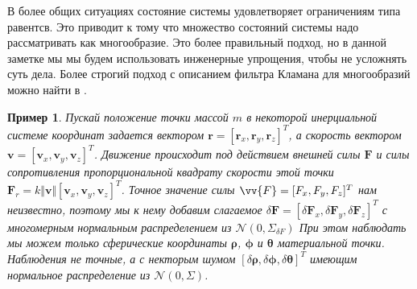 \documentclass[12pt]{article}
\newtheorem{example}[theorem]{Пример}
\begin{document}
В более общих ситуациях состояние системы удовлетворяет ограничениям типа равентсв. Это приводит к тому 
что множество состояний системы надо рассматривать как многообразие. Это более правильный подход, но в 
данной заметке мы мы будем использовать инженерные упрощения, чтобы не усложнять суть дела. Более строгий
подход с описанием фильтра Кламана для многообразий можно найти в \cite{KalmFiltDiffMan}.


\begin{example}
    Пускай положение точки массой $m$ в некоторой
    инерциальной системе координат задается вектором
    $\pmb{r}=[\pmb{r}_x, \pmb{r}_y, \pmb{r}_z]^T$, а скорость
    вектором $\pmb{v}=[\pmb{v}_x, \pmb{v}_y, \pmb{v}_z]^T$.
    Движение происходит под действием внешней
    силы $\pmb{F}$ и силы сопротивления пропорциональной квадрату
    скорости этой точки $\pmb{F}_r=k\Vert \pmb{v}\Vert[\pmb{v}_x, \pmb{v}_y, \pmb{v}_z]^T$.
    Точное значение силы $\vv{F}=[F_x, F_y, F_z]^T$ нам
    неизвестно, поэтому мы к нему добавим слагаемое
    $\delta \pmb{F}=[\delta \pmb{F}_x,\delta \pmb{F}_y,\delta \pmb{F}_z]^T$
    с многомерным нормальным распределением
    из $\mathcal{N}(0, \Sigma_{\delta F})$
    При этом наблюдать мы можем только сферические координаты
    $\pmb{\rho}$, $\pmb{\phi}$ и $\pmb{\theta}$ материальной точки.
    Наблюдения не точные, а с некторым шумом
    $[\delta \pmb{\rho}, \delta\pmb{\phi}, \delta\pmb{\theta}]^T$ имеющим
    нормальное распределение из $\mathcal{N}(0, \Sigma)$.


\end{example}
\end{document}
